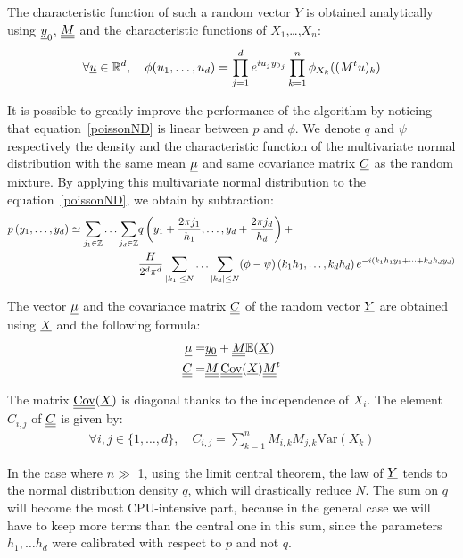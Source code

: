 The characteristic function of such a random vector $Y$ is obtained analytically using ${\underline{y}}_0$, ${\underline{\underline{M}}}$ and the characteristic functions of $X_1$,\dots,$X_n$:
\begin{align}
  \forall {\underline{u}}\in\mathbb{R}^d,\quad\phi(u_1,\hdots,u_d)=\prod_{j=1}^de^{iu_j{y_0}_j}\prod_{k=1}^n\phi_{X_k}((M^tu)_k)
\end{align}

It is possible to greatly improve the performance of the algorithm by noticing that equation~\eqref{poissonND} is linear between $p$
and $\phi $. We denote $q$ and $\psi$ respectively the density and the characteristic function of the multivariate normal distribution with the
same mean ${\underline{\mu}}$ and same covariance matrix ${\underline{C}}$ as the random mixture. By applying this multivariate normal distribution to the equation~\eqref{poissonND}, we obtain by subtraction:
\begin{align}\label{algoPoisson}
p\left(y_1,\hdots,y_d\right)\simeq \sum_{j_1\in\mathbb{Z}}\hdots\sum_{j_d\in\mathbb{Z}}
  &q\left(y_1+\frac{2\pi j_1}{h_1},\hdots,y_d+\frac{2\pi j_d}{h_d}\right)+\notag\\
  &\frac{H}{2^d\pi^d}\sum_{|k_1|\leq N}\hdots\sum_{|k_d|\leq N}(\phi-\psi)\left(k_1h_1,\hdots,k_dh_d\right)e^{-i(k_1h_1y_1+\cdots+k_dh_dy_d)}
\end{align}

The vector ${\underline{\mu}}$ and the covariance matrix ${\underline{\underline{C}}}$ of the random vector ${\underline{Y}}$ are obtained using ${\underline{X}}$ and the following formula:
\begin{align}
  {\underline{\mu}}=& {\underline{y_0}} + {\underline{\underline{M}}}\mathbb{E}({\underline{X}})\\
  {\underline{\underline{C}}}=&{\underline{\underline{M}}}\,{\underline{\underline{\mathrm{Cov}}}}({\underline{X}}){\underline{\underline{M}}}^t\\
\end{align}

The matrix ${\underline{\underline{\mathrm{Cov}}}}({\underline{X}})$ is diagonal thanks to the independence of $X_i$.
The element $C_{i,j}$ of ${\underline{\underline{C}}}$ is given by:
\begin{align}
\forall i,j\in\{1,\hdots,d\},\quad C_{i,j}=\sum_{k=1}^nM_{i,k}M_{j,k}\mathrm{Var}(X_k)
\end{align}

In the case where $n \gg $ 1, using the limit central theorem, the law of ${\underline{Y}} $ tends to the normal distribution density $q$,
which will drastically reduce $N$.  The sum on $q$ will become the most CPU-intensive part, because in the general case we will
have to keep more terms than the central one in this sum, since the parameters $ h_1, \dots  h_d$ were calibrated
with respect to $p$ and not $q$.


